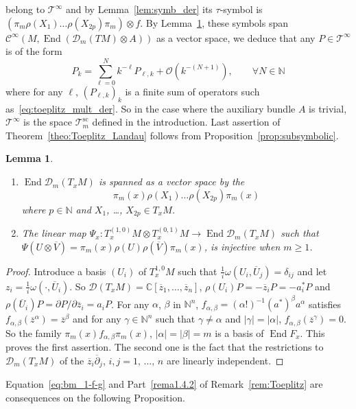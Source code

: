 \documentclass[10pt,a4paper]{article}
\newtheorem{lemm}[theo]{Lemma}
\theoremstyle{definition}
\numberwithin{equation}{section}
\newcommand{\N}{{\mathbb{N}}}
\newcommand{\C}{{\mathbb{C}}}
\newcommand{\be}{{\beta}}
\newcommand{\al}{{\alpha}}
\newcommand{\ga}{{\gamma}}
\newcommand{\om}{{\omega}}
\newcommand{\con}{\overline}
\newcommand{\op}{\operatorname}
\newcommand{\Ci}{{\mathcal{C}}^{\infty}}
\newcommand{\bigo}{\mathcal{O}}
\newcommand{\D}{\mathcal{D}}
\newcommand{\clT}{\mathcal{T}}
\let\oldforall\forall
\renewcommand*{\forall}{\mathrel{\oldforall}}
\begin{document}
belong to $\clT^{\infty}$ and  by Lemma~\ref{lem:symb_der}  its $\tau$-symbol is $ (\pi_m \rho(X_1) \ldots
\rho(X_{2p})\pi_m) \otimes f $. By Lemma~\ref{lem:algebraic}, these symbols span $\Ci (M,
\op{End} (\D_m (TM) \otimes A))$ as a vector space, we deduce that any $P \in \clT^{\infty}$ is of the form
\[
P_k = \sum_{\ell =0 }^N k^{-\ell} P_{\ell,k} + \bigo \left(k^{-(N+1)}\right), \qquad
\forall N \in \N
\]
where for any $\ell$, $(P_{\ell,k})_k$ is a finite sum of operators such as~\eqref{eq:toeplitz_mult_der}. So in the case where the auxiliary bundle $A$ is trivial, $\clT^{\infty}$ is the space $\clT^{\op{sc}}_m$ defined in the introduction. Last assertion of Theorem~\ref{theo:Toeplitz_Landau} follows from Proposition~\ref{prop:subsymbolic}.

\begin{lemm}\label{lem:algebraic}\leavevmode
\begin{enumerate}
\item\label{lemm6.8.1} $\op{End} \D_m(T_xM)$ is spanned as a vector space by the
\[
\pi_m (x) \rho (X_1) \ldots \rho (X_{2p}) \pi_m (x)
\]
where $p \in \N$ and $X_1$,
\ldots, $X_{2p} \in T_xM$.
\item\label{lemm6.8.2} The linear map $\Psi_x : T^{(1,0)} _xM \otimes T^{(0,1)} _xM \rightarrow \op{End} \D_m (T_xM)$ such that $\Psi (U \otimes
\con{V})= \pi_m (x) \rho (U)
\rho (\con{V}) \pi_m (x)$, is injective when $m \geqslant 1$.
\end{enumerate}
\end{lemm}

\begin{proof}
Introduce a
basis $(U_i)$ of $T^{1,0}_xM$ such that $\frac{1}{i} \om (U_i, \con {U}_j) = \delta_{ij}$ and let $z_i = \frac{1}{i} \om (\cdot,\con{U}_i)$. So $ \D (T_x M) = \C [\con{z}_1, \ldots, \con{z}_n]$, $\rho (U_i) P = - \con{z}_i P = - a_i^* P$ and $ \rho (\con{U}_i) P = \partial P / \partial
\con{z}_i = a_i P$. For any $\al $, $\be$ in $\N^n$, $f_{\al, \be}= (\al!)^{-1} (a^*)^{\be} a^\al$ satisfies $f_{\al,\be} (\con{z}^\al) =
\con{z}^\be$ and for any $\ga \in \N^n$ such that $\ga \neq \al$ and $| \ga | = |
\al |$, $f_{\al,\be} (\con{z}^\ga) = 0$. So the family $\pi_m(x) f_{\al, \be}
\pi_m (x)$, $| \al | = | \be | =m$ is a basis of $\op{End} F_x$. This proves the first assertion. The second one is the fact that the restrictions to $\D_m (T_xM)$ of the $ \con{z}_i \con{\partial}_j$, $i, j =1,\, \ldots,\, n$ are linearly independent.
\end{proof}


Equation~\eqref{eq:bm_1-f-g} and Part~\eqref{rema1.4.2} of Remark~\ref{rem:Toeplitz} are consequences on the following Proposition.
\end{document}
